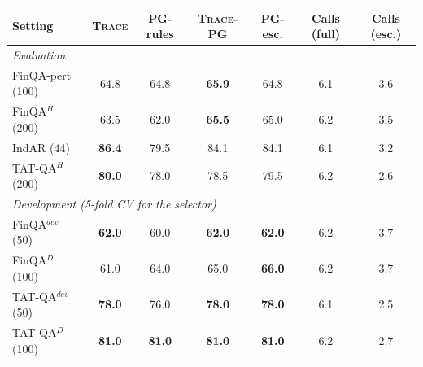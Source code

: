 \begin{tabular}{lcccc|cc}
\toprule
Setting & \textsc{Trace} & PG-rules & \textsc{Trace}-PG & PG-esc. & Calls (full) & Calls (esc.) \\
\midrule
\multicolumn{7}{l}{\emph{Evaluation}} \\
FinQA-pert (100) & 64.8 & 64.8 & \textbf{65.9} & 64.8 & 6.1 & 3.6 \\
FinQA$^{H}$ (200) & 63.5 & 62.0 & \textbf{65.5} & 65.0 & 6.2 & 3.5 \\
IndAR (44) & \textbf{86.4} & 79.5 & 84.1 & 84.1 & 6.1 & 3.2 \\
TAT-QA$^{H}$ (200) & \textbf{80.0} & 78.0 & 78.5 & 79.5 & 6.2 & 2.6 \\
\multicolumn{7}{l}{\emph{Development (5-fold CV for the selector)}} \\
FinQA$^{dev}$ (50) & \textbf{62.0} & 60.0 & \textbf{62.0} & \textbf{62.0} & 6.2 & 3.7 \\
FinQA$^{D}$ (100) & 61.0 & 64.0 & 65.0 & \textbf{66.0} & 6.2 & 3.7 \\
TAT-QA$^{dev}$ (50) & \textbf{78.0} & 76.0 & \textbf{78.0} & \textbf{78.0} & 6.1 & 2.5 \\
TAT-QA$^{D}$ (100) & \textbf{81.0} & \textbf{81.0} & \textbf{81.0} & \textbf{81.0} & 6.2 & 2.7 \\
\bottomrule
\end{tabular}
